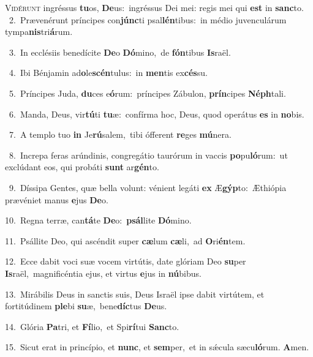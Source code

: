 \lettrine{\initial\textcolor{\initialcolor}{V}}{idérunt} ingréssus \textbf{tu}\-os, \textbf{De}\-us:~\star ingréssus Dei mei: regis mei qui \textbf{est} in \textbf{sanc}\-to.\\
{\numbfont\textcolor{\numbcolor}{~2.}}~Prævenérunt príncipes con\-\textbf{júnc}\-ti psal\-\textbf{lén}\-tibus:~\star in médio juvenculárum tympa\-\textbf{nis}\-tri\-\textbf{á}\-rum.\par
{\numbfont\textcolor{\numbcolor}{~3.}}~In ecclésiis benedícite \textbf{De}\-o \textbf{Dó}\-mino,~\star de \textbf{fón}\-tibus \textbf{Is}\-raël.\par
{\numbfont\textcolor{\numbcolor}{~4.}}~Ibi Bénjamin ad\-\textbf{o}\-le\-\textbf{scén}\-tulus:~\star in \textbf{men}\-tis ex\-\textbf{cés}\-su.\par
{\numbfont\textcolor{\numbcolor}{~5.}}~Príncipes Juda, \textbf{du}\-ces e\-\textbf{ó}\-rum:~\star príncipes Zábulon, \textbf{prín}\-cipes \textbf{Néph}\-tali.\par
{\numbfont\textcolor{\numbcolor}{~6.}}~Manda, Deus, vir\-\textbf{tú}\-ti \textbf{tu}\-æ:~\star confírma hoc, Deus, quod operátus \textbf{es} in \textbf{no}\-bis.\par
{\numbfont\textcolor{\numbcolor}{~7.}}~A templo tuo \textbf{in} Je\-\textbf{rú}\-salem,~\star tibi ófferent \textbf{re}\-ges \textbf{mú}\-nera.\par
{\numbfont\textcolor{\numbcolor}{~8.}}~Increpa feras arúndinis, congregátio taurórum in vaccis \textbf{po}\-pu\-\textbf{ló}\-rum:~\star ut exclúdant eos, qui probáti \textbf{sunt} ar\-\textbf{gén}\-to.\par
{\numbfont\textcolor{\numbcolor}{~9.}}~Díssipa Gentes, quæ bella volunt: vénient legáti \textbf{ex} Æ\-\textbf{gýp}\-to:~\star Æthiópia prævéniet manus \textbf{e}\-jus \textbf{De}\-o.\par
{\numbfont\textcolor{\numbcolor}{10.}}~Regna terræ, can\-\textbf{tá}\-te \textbf{De}\-o:~\star \textbf{psál}\-lite \textbf{Dó}\-mino.\par
{\numbfont\textcolor{\numbcolor}{11.}}~Psállite Deo, qui ascéndit super \textbf{cæ}\-lum \textbf{cæ}\-li,~\star ad \textbf{O}\-ri\-\textbf{én}\-tem.\par
{\numbfont\textcolor{\numbcolor}{12.}}~Ecce dabit voci suæ vocem virtútis, date glóriam Deo \textbf{su}\-per \textbf{Is}\-raël,~\star magnificéntia ejus, et virtus \textbf{e}\-jus in \textbf{nú}\-bibus.\par
{\numbfont\textcolor{\numbcolor}{13.}}~Mirábilis Deus in sanctis suis, Deus Israël ipse dabit virtútem, et fortitúdinem \textbf{ple}\-bi \textbf{su}\-æ,~\star bene\-\textbf{díc}\-tus \textbf{De}\-us.\par
{\numbfont\textcolor{\numbcolor}{14.}}~Glória \textbf{Pa}\-tri, et \textbf{Fí}\-lio,~\star et Spi\-\textbf{rí}\-tui \textbf{Sanc}\-to.\par
{\numbfont\textcolor{\numbcolor}{15.}}~Sicut erat in princípio, et \textbf{nunc}\-, et \textbf{sem}\-per,~\star et in sǽcula sæcu\-\textbf{ló}\-rum. \textbf{A}\-men.\par

